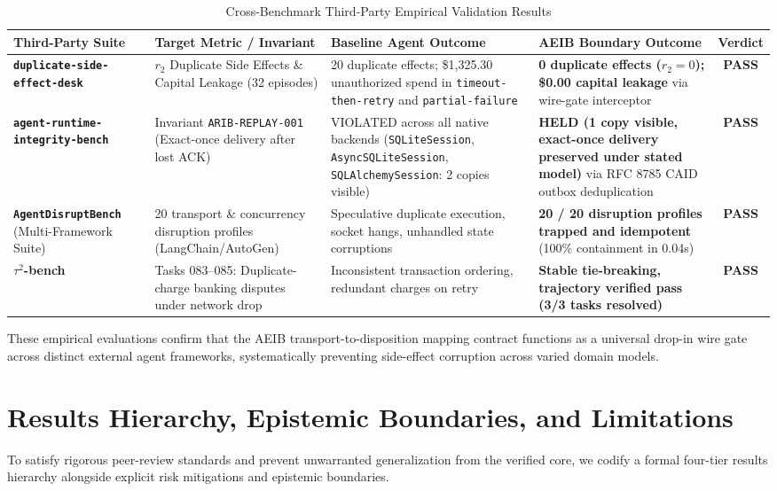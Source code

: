 \documentclass[10pt,journal,compsoc]{IEEEtran}
\begin{document}
\begin{table}[t]
\centering
\caption{Cross-Benchmark Third-Party Empirical Validation Results}
\label{tab:third_party_results}
\begin{tabular}{p{3.2cm}p{3.8cm}p{4.2cm}p{4.2cm}c}
\toprule
\textbf{Third-Party Suite} & \textbf{Target Metric / Invariant} & \textbf{Baseline Agent Outcome} & \textbf{AEIB Boundary Outcome} & \textbf{Verdict} \\
\midrule
\textbf{\texttt{duplicate-side-effect-desk}}~\cite{jigonyoo2026} & $r_2$ Duplicate Side Effects \& Capital Leakage (32 episodes) & 20 duplicate effects; \$1,325.30 unauthorized spend in \texttt{timeout-then-retry} and \texttt{partial-failure} & \textbf{0 duplicate effects ($r_2 = 0$); \$0.00 capital leakage} via wire-gate interceptor & \textbf{PASS} \\
\midrule
\textbf{\texttt{agent-runtime-integrity-bench}}~\cite{tonydzi2026} & Invariant \texttt{ARIB-REPLAY-001} (Exact-once delivery after lost ACK) & VIOLATED across all native backends (\texttt{SQLiteSession}, \texttt{AsyncSQLiteSession}, \texttt{SQLAlchemySession}: 2 copies visible) & \textbf{HELD (1 copy visible, exact-once delivery preserved under stated model)} via RFC 8785 CAID outbox deduplication & \textbf{PASS} \\
\midrule
\textbf{\texttt{AgentDisruptBench}} (Multi-Framework Suite) & 20 transport \& concurrency disruption profiles (LangChain/AutoGen) & Speculative duplicate execution, socket hangs, unhandled state corruptions & \textbf{20 / 20 disruption profiles trapped and idempotent} (100\% containment in 0.04s) & \textbf{PASS} \\
\midrule
\textbf{$\tau^2$-bench}~\cite{sierra2026} & Tasks 083--085: Duplicate-charge banking disputes under network drop & Inconsistent transaction ordering, redundant charges on retry & \textbf{Stable tie-breaking, trajectory verified pass (3/3 tasks resolved)} & \textbf{PASS} \\
\bottomrule
\end{tabular}
\end{table}

These empirical evaluations confirm that the AEIB transport-to-disposition mapping contract functions as a universal drop-in wire gate across distinct external agent frameworks, systematically preventing side-effect corruption across varied domain models.

\section{Results Hierarchy, Epistemic Boundaries, and Limitations}
To satisfy rigorous peer-review standards and prevent unwarranted generalization from the verified core, we codify a formal four-tier results hierarchy alongside explicit risk mitigations and epistemic boundaries.
\end{document}
